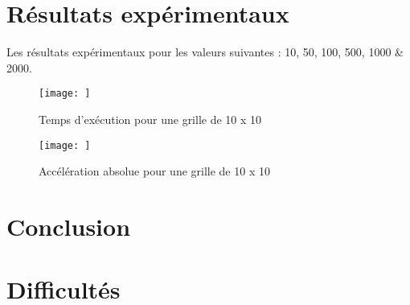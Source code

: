 \documentclass[10pt,a4paper]{article}
\begin{document}
\section{Résultats expérimentaux}

Les résultats expérimentaux pour les valeurs suivantes : 10, 50, 100, 500, 1000 \& 2000. \\
\begin{figure}[h]
  \centering
  \begin{minipage}[b]{0.49\textwidth}
	\texttt{[image: ]}
    \caption{Temps d'exécution pour une grille de 10 x 10}
  \end{minipage}
  \hfill
  \begin{minipage}[b]{0.49\textwidth}
    \texttt{[image: ]}
    \caption{Accélération absolue pour une grille de 10 x 10}
  \end{minipage}
\end{figure}

\section{Conclusion}

\section{Difficultés}
\end{document}
